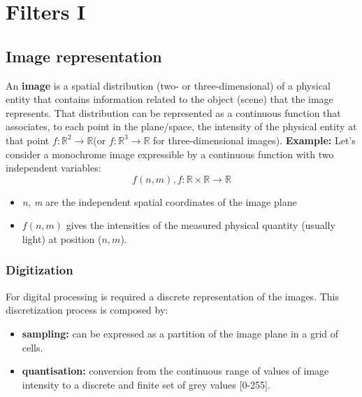 \chapter{Filters I}

\section{Image representation}
An \textbf{image} is a spatial distribution (two- or three-dimensional) of a physical entity that contains information related to the object (scene) that the image represents. That distribution can be represented as a continuous function that associates, to each point in the plane/space, the intensity of the physical entity at that point $f : \mathbb{R}^{2} \rightarrow \mathbb{R}$(or $f : \mathbb{R}^{3} \rightarrow \mathbb{R}$ for three-dimensional images).\newline
\textbf{Example:}\newline
Let's consider a monochrome image expressible by a continuous function with two independent variables:
\[f(n,m), f: \mathbb{R} \times \mathbb{R} \rightarrow \mathbb{R}\]
\begin{itemize}
    \item \textit{n, m} are the independent spatial coordinates of the image plane
    \item $f(n,m)$ gives the intensities of the measured physical quantity (usually light) at position ($n,m$).
\end{itemize}

\subsection{Digitization}
For digital processing is required a discrete representation of the images. This discretization process is composed by:
\begin{itemize}
    \item \textbf{sampling:} can be expressed as a partition of the image plane in a grid of cells.
    \item \textbf{quantisation:} conversion from the continuous range of values of image intensity to a discrete and finite set of grey values [0-255].
\end{itemize}
